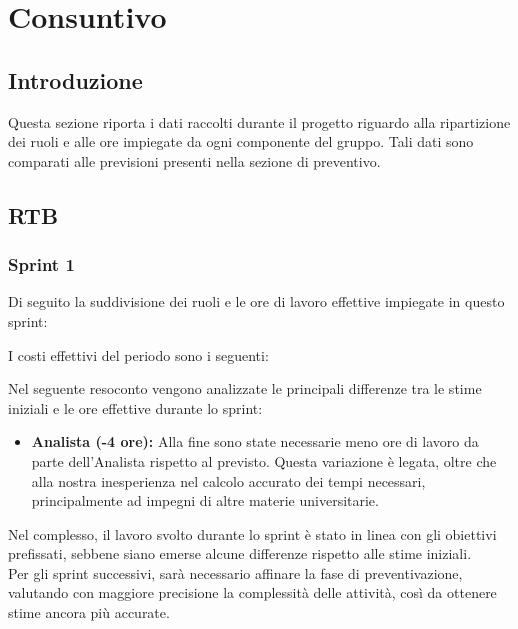 \section{Consuntivo}
\subsection{Introduzione}
Questa sezione riporta i dati raccolti durante il progetto riguardo alla
ripartizione dei ruoli e alle ore impiegate da ogni componente del gruppo. Tali
dati sono comparati alle previsioni presenti nella sezione di preventivo.

\subsection{RTB}

\subsubsection{Sprint 1}
Di seguito la suddivisione dei ruoli e le ore di lavoro effettive impiegate in
questo sprint:




I costi effettivi del periodo sono i seguenti:




Nel seguente resoconto vengono analizzate le principali differenze tra le stime iniziali e le ore effettive durante lo sprint:
\begin{itemize}
    \item \textbf{Analista (-4 ore):} Alla fine sono state necessarie meno ore di lavoro da parte
          dell'Analista rispetto al previsto. Questa variazione è legata, oltre che alla nostra inesperienza nel calcolo
          accurato dei tempi necessari, principalmente ad impegni di altre materie universitarie.

\end{itemize}
Nel complesso, il lavoro svolto durante lo sprint è stato in linea con gli obiettivi prefissati, sebbene siano emerse alcune differenze rispetto alle stime iniziali.\\
Per gli sprint successivi, sarà necessario affinare la fase di preventivazione, valutando con
maggiore precisione la complessità delle attività, così da ottenere stime ancora più accurate.\\

